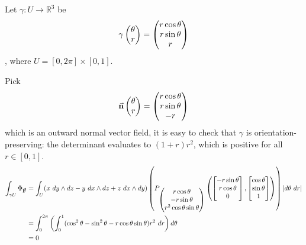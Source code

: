 \documentclass{homework}
\begin{document}
\begin{problem}{11}
  Let $\gamma: U \to \mathbb{R}^3$ be
  $$\gamma \begin{pmatrix}\theta \\ r\end{pmatrix} = \begin{pmatrix}r\cos\theta \\ r\sin\theta \\ r\end{pmatrix}$$
  , where $U = [0, 2\pi] \times [0, 1]$.
  
  Pick
  $$\vec{\mathbf{n}} \begin{pmatrix}\theta \\ r\end{pmatrix} = \begin{pmatrix}r\cos\theta \\ r\sin\theta \\ -r\end{pmatrix}$$
  which is an outward normal vector field, it is easy to check that $\gamma$ is
  orientation-preserving: the determinant evaluates to $(1+r)r^2$, which is
  positive for all $r \in [0, 1]$.
  \begin{align*}
    \int_{\gamma{U}} \Phi_{\bvec{F}} &=
    \int_U (x\ dy \land dz - y\ dx \land dz + z\ dx \land dy) \left(
      P_{\pmat{r\cos\theta \\ -r\sin\theta \\ r^2\cos\theta\sin\theta}}
        \left(
          \bmat{-r\sin\theta \\ r\cos\theta \\ 0},
          \bmat{  \cos\theta \\ \sin\theta  \\ 1}
        \right)
      \right) |d\theta\ dr| \\ &=
    \int_0^{2\pi} \left(
      \int_0^1 (\cos^2\theta - \sin^2\theta - r\cos\theta\sin\theta)r^2\ dr
    \right) d\theta \\ &= 0
  \end{align*}
\end{problem}
\end{document}
